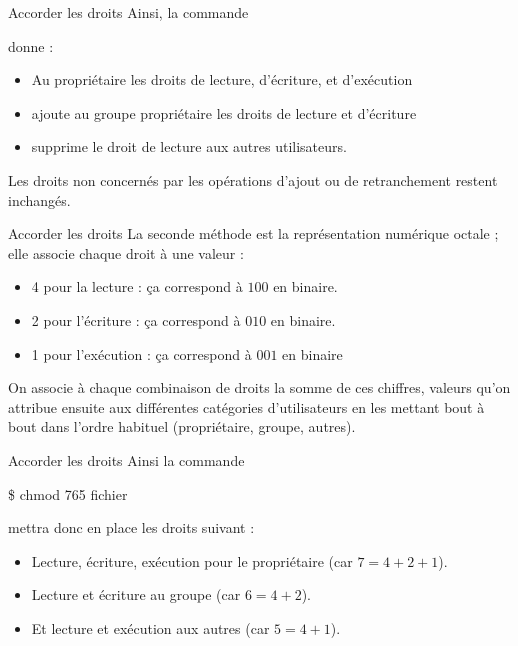 \documentclass[10pt]{beamer}
\begin{document}
\begin{frame}[fragile]{Accorder les droits}
Ainsi, la commande
 
 donne :
\pause
\begin{itemize}
\item Au propriétaire les droits de lecture, d'écriture, et d'exécution
\item ajoute au groupe propriétaire les droits de lecture et d'écriture
\item supprime le droit de lecture aux autres utilisateurs.
\end{itemize}
Les droits non concernés par les opérations d'ajout ou de retranchement restent inchangés.
\end{frame}

\begin{frame}{Accorder les droits}
La seconde méthode est la représentation numérique octale ; elle associe chaque droit à une valeur :
\begin{itemize}
\item 4 pour la lecture : ça correspond à $100$ en binaire.
\item 2 pour l'écriture : ça correspond à $010$ en binaire.
\item 1 pour l'exécution : ça correspond à $001$ en binaire
\end{itemize}
\pause
On associe à chaque combinaison de droits la somme de ces chiffres, valeurs qu'on
attribue ensuite aux différentes catégories d'utilisateurs en les mettant bout à bout
dans l'ordre habituel (propriétaire, groupe, autres).
\end{frame}

\begin{frame}[fragile]{Accorder les droits}
Ainsi la commande 
\begin{mylisting}
\$ chmod 765 fichier
\end{mylisting}
mettra donc en place les droits suivant :
\pause
\begin{itemize}
\item Lecture, écriture, exécution pour le propriétaire (car $7=4+2+1$).
\item Lecture et écriture au groupe (car $6=4+2$).
\item Et lecture et exécution aux autres (car $5=4+1$).
\end{itemize}
\end{frame}
\end{document}
